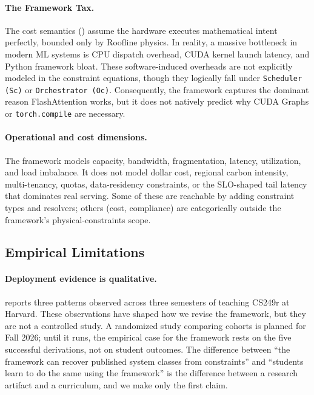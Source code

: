 \documentclass[10pt,twocolumn]{article}
\begin{document}
\paragraph{The Framework Tax.} The cost semantics () assume the hardware executes mathematical intent perfectly, bounded only by Roofline physics. In reality, a massive bottleneck in modern ML systems is CPU dispatch overhead, CUDA kernel launch latency, and Python framework bloat. These software-induced overheads are not explicitly modeled in the constraint equations, though they logically fall under \texttt{Scheduler (Sc)} or \texttt{Orchestrator (Oc)}. Consequently, the framework captures the dominant reason FlashAttention works, but it does not natively predict why CUDA Graphs or \texttt{torch.compile} are necessary.

\paragraph{Operational and cost dimensions.} The framework models capacity, bandwidth, fragmentation, latency, utilization, and load imbalance. It does not model dollar cost, regional carbon intensity, multi-tenancy, quotas, data-residency constraints, or the SLO-shaped tail latency that dominates real serving. Some of these are reachable by adding constraint types and resolvers; others (cost, compliance) are categorically outside the framework's physical-constraints scope.

\subsection{Empirical Limitations}

\paragraph{Deployment evidence is qualitative.}  reports three patterns observed across three semesters of teaching CS249r at Harvard. These observations have shaped how we revise the framework, but they are not a controlled study. A randomized study comparing cohorts is planned for Fall 2026; until it runs, the empirical case for the framework rests on the five successful derivations, not on student outcomes. The difference between ``the framework can recover published system classes from constraints'' and ``students learn to do the same using the framework'' is the difference between a research artifact and a curriculum, and we make only the first claim.
\end{document}
